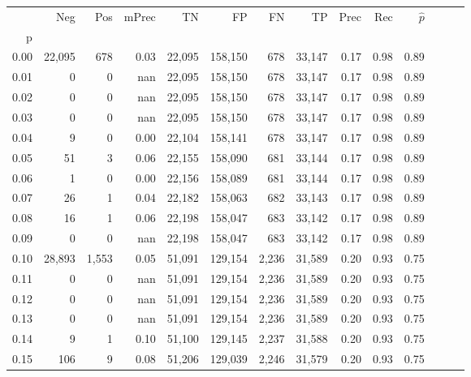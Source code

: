 \begin{tabular}{rrrrrrrrrrrrrr}
\toprule
{} &     Neg &    Pos & mPrec &       TN &       FP &      FN &      TP &  Prec &   Rec & $\hat{p}$ \\
p    &         &        &       &          &          &         &         &       &       &           \\
\midrule
0.00 &  22,095 &    678 &  0.03 &   22,095 &  158,150 &     678 &  33,147 &  0.17 &  0.98 &      0.89 \\
0.01 &       0 &      0 &   nan &   22,095 &  158,150 &     678 &  33,147 &  0.17 &  0.98 &      0.89 \\
0.02 &       0 &      0 &   nan &   22,095 &  158,150 &     678 &  33,147 &  0.17 &  0.98 &      0.89 \\
0.03 &       0 &      0 &   nan &   22,095 &  158,150 &     678 &  33,147 &  0.17 &  0.98 &      0.89 \\
0.04 &       9 &      0 &  0.00 &   22,104 &  158,141 &     678 &  33,147 &  0.17 &  0.98 &      0.89 \\
0.05 &      51 &      3 &  0.06 &   22,155 &  158,090 &     681 &  33,144 &  0.17 &  0.98 &      0.89 \\
0.06 &       1 &      0 &  0.00 &   22,156 &  158,089 &     681 &  33,144 &  0.17 &  0.98 &      0.89 \\
0.07 &      26 &      1 &  0.04 &   22,182 &  158,063 &     682 &  33,143 &  0.17 &  0.98 &      0.89 \\
0.08 &      16 &      1 &  0.06 &   22,198 &  158,047 &     683 &  33,142 &  0.17 &  0.98 &      0.89 \\
0.09 &       0 &      0 &   nan &   22,198 &  158,047 &     683 &  33,142 &  0.17 &  0.98 &      0.89 \\
0.10 &  28,893 &  1,553 &  0.05 &   51,091 &  129,154 &   2,236 &  31,589 &  0.20 &  0.93 &      0.75 \\
0.11 &       0 &      0 &   nan &   51,091 &  129,154 &   2,236 &  31,589 &  0.20 &  0.93 &      0.75 \\
0.12 &       0 &      0 &   nan &   51,091 &  129,154 &   2,236 &  31,589 &  0.20 &  0.93 &      0.75 \\
0.13 &       0 &      0 &   nan &   51,091 &  129,154 &   2,236 &  31,589 &  0.20 &  0.93 &      0.75 \\
0.14 &       9 &      1 &  0.10 &   51,100 &  129,145 &   2,237 &  31,588 &  0.20 &  0.93 &      0.75 \\
0.15 &     106 &      9 &  0.08 &   51,206 &  129,039 &   2,246 &  31,579 &  0.20 &  0.93 &      0.75 \\

\end{tabular}
